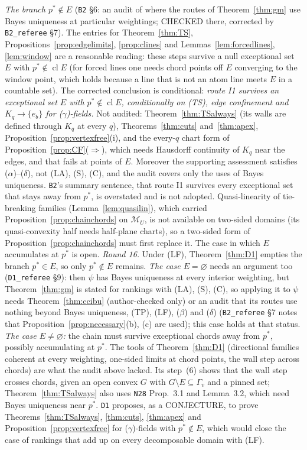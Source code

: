 \documentclass[11pt]{article}
\theoremstyle{definition}
\theoremstyle{remark}
\newcommand{\M}{\mathcal M}
\newcommand{\cl}{\operatorname{cl}}
\newcommand{\src}[1]{\texttt{#1}}
\begin{document}
\emph{The branch $p^*\notin E$} (\src{B2} \S6: an audit of where the routes of Theorem~\ref{thm:gm} use Bayes uniqueness at particular weightings; CHECKED there, corrected by \src{B2\_referee} \S7). The entries for Theorem~\ref{thm:TS}, Propositions~\ref{prop:edgelimits}, \ref{prop:clines} and Lemmas~\ref{lem:forcedlines}, \ref{lem:window} are a reasonable reading: these steps survive a null exceptional set $E$ with $p^*\notin\cl E$ (for forced lines one needs chord points off $E$ converging to the window point, which holds because a line that is not an atom line meets $E$ in a countable set). The corrected conclusion is conditional: \emph{route I1 survives an exceptional set $E$ with $p^*\notin\cl E$, conditionally on (TS), edge confinement and $K_q\to\{e_b\}$ for ($\gamma$)-fields.} Not audited: Theorem~\ref{thm:TSalways} (its walls are defined through $K_q$ at every $q$), Theorems~\ref{thm:cuts} and~\ref{thm:apex}, Proposition~\ref{prop:vertexfree}(i), and the every-$q$ chart form of Proposition~\ref{prop:CF}($\Rightarrow$), which needs Hausdorff continuity of $K_q$ near the edges, and that fails at points of $E$. Moreover the supporting assessment satisfies ($\alpha$)--($\delta$), not (LA), (S), (C), and the audit covers only the uses of Bayes uniqueness. \src{B2}'s summary sentence, that route I1 survives every exceptional set that stays away from $p^*$, is overstated and is not adopted. Quasi-linearity of tie-breaking families (Lemma~\ref{lem:quasilin}), which carried Proposition~\ref{prop:chainchords} on $\M_U$, is not available on two-sided domains (its quasi-convexity half needs half-plane charts), so a two-sided form of Proposition~\ref{prop:chainchords} must first replace it. The case in which $E$ accumulates at $p^*$ is open. \emph{Round 16.} Under (LF), Theorem~\ref{thm:D1} empties the branch $p^*\in E$, so only $p^*\notin E$ remains. \emph{The case $E=\varnothing$} needs an argument too (\src{D1\_referee} \S9): then $\psi$ has Bayes uniqueness at every interior weighting, but Theorem~\ref{thm:gm} is stated for rankings with (LA), (S), (C), so applying it to $\psi$ needs Theorem~\ref{thm:ccibu} (author-checked only) or an audit that its routes use nothing beyond Bayes uniqueness, (TP), (LF), ($\beta$) and ($\delta$) (\src{B2\_referee} \S7 notes that Proposition~\ref{prop:necessary}(b), (c) are used); this case holds at that status. \emph{The case $E\ne\varnothing$:} the chain must survive exceptional chords away from $p^*$, possibly accumulating at $p^*$. The tools of Theorem~\ref{thm:D1} (directional families coherent at every weighting, one-sided limits at chord points, the wall step across chords) are what the audit above lacked. Its step~(6) shows that the wall step crosses chords, given an open convex $G$ with $G\setminus E\subseteq\Gamma_v$ and a pinned set; Theorem~\ref{thm:TSalways} also uses \src{N28} Prop.~3.1 and Lemma~3.2, which need Bayes uniqueness near $p^*$. \src{D1} proposes, as a CONJECTURE, to prove Theorems~\ref{thm:TSalways}, \ref{thm:cuts}, \ref{thm:apex} and Proposition~\ref{prop:vertexfree} for ($\gamma$)-fields with $p^*\notin E$, which would close the case of rankings that add up on every decomposable domain with (LF).
\end{document}
